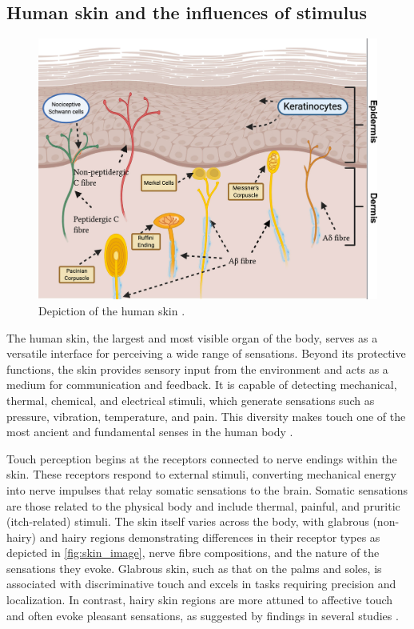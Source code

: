 \subsection{Human skin and the influences of stimulus}
\begin{figure}
    \centering
    \includegraphics[width=0.7\linewidth]{src//pictures/skin.jpg}
    \caption{Depiction of the human skin \cite{lowy2021cutaneous}.}
    \label{fig:skin_image}
\end{figure}

The human skin, the largest and most visible organ of the body, serves as a versatile interface for perceiving a wide range of sensations. Beyond its protective functions, the skin provides sensory input from the environment and acts as a medium for communication and feedback. It is capable of detecting mechanical, thermal, chemical, and electrical stimuli, which generate sensations such as pressure, vibration, temperature, and pain. This diversity makes touch one of the most ancient and fundamental senses in the human body \cite{Fang2023}.

Touch perception begins at the receptors connected to nerve endings within the skin. These receptors respond to external stimuli, converting mechanical energy into nerve impulses that relay somatic sensations to the brain. Somatic sensations are those related to the physical body and include thermal, painful, and pruritic (itch-related) stimuli. The skin itself varies across the body, with glabrous (non-hairy) and hairy regions demonstrating differences in their receptor types as depicted in \autoref{fig:skin_image}, nerve fibre compositions, and the nature of the sensations they evoke. Glabrous skin, such as that on the palms and soles, is associated with discriminative touch and excels in tasks requiring precision and localization. In contrast, hairy skin regions are more attuned to affective touch and often evoke pleasant sensations, as suggested by findings in several studies \cite{Fang2023, ackerley2014quantifying,ackerley2016touch}.

